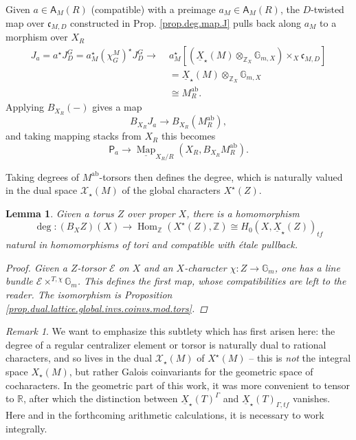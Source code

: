 \documentclass[openany]{amsbook}
\newtheorem{lemma}[theorem]{Lemma}
\theoremstyle{definition}
\theoremstyle{remark}
\newtheorem{remark}[theorem]{Remark}
\numberwithin{equation}{section}
\newcommand{\R}{\mathbb{R}}
\newcommand{\Z}{\mathbb{Z}}
\newcommand{\G}{\mathbb{G}}
\newcommand{\cE}{\mathcal{E}}
\newcommand{\cX}{\mathcal{X}}
\newcommand{\ul}[1]{\underline{#1}}
\renewcommand{\-}{\operatorname{-}}
\newcommand{\Hom}{\operatorname{Hom}}
\newcommand{\Map}{\ul{\operatorname{Map}}}
\newcommand{\bA}{\mathsf{A}}
\newcommand{\bP}{\mathsf{P}}
\newcommand{\fc}{\mathfrak{c}}
\newcommand{\tf}{\mathit{tf}}
\newcommand{\ab}{\mathrm{ab}}
\begin{document}
Given $a \in \bA_{M}(R)$ (compatible) with a preimage $a_M \in \bA_M(R)$, the $D$-twisted map over $\fc_{M,D}$ constructed in Prop. \ref{prop.deg.map.J} pulls back along $a_M$ to a morphism over $X_R$
\begin{align*}
    J_{a} = a^\star J^G_D = a_M^\star (\chi^M_G)^\star J^G_D \longrightarrow \; & a_M^\star\left[(\ul{X}_\star(M) \otimes_{\Z_X} \G_{m,X}) \times_X \fc_{M,D}\right] \\
        &= \ul{X}_\star(M) \otimes_{\Z_X} \G_{m,X} \\
        &\cong M^{\ab}_R.
\end{align*}
Applying $B_{X_R}(-)$ gives a map
$$
    B_{X_R} J_{a} \to B_{X_R}(M^{\ab}_R),
$$
and taking mapping stacks from $X_R$ this becomes
$$
    \bP_a \to \Map_{X_R/R}(X_R, B_{X_R} M^{\ab}_R). 
$$

Taking degrees of $M^{\ab}$-torsors then defines the degree, which is naturally valued in the dual space $\cX_\star(M)$ of the global characters $X^\star(Z)$. 

\begin{lemma}\label{lem.deg.B.torus}
    Given a torus $Z$ over proper $X$, there is a homomorphism
    $$
        \deg : (B_X Z)(X) \to \Hom_{\Z}(X^\star(Z), \Z) \cong H_0(X, \ul{X}_\star(Z))_{\tf}
    $$
    natural in homomorphisms of tori and compatible with \'etale pullback.
    \begin{proof}
        Given a $Z$-torsor $\cE$ on $X$ and an $X$-character $\chi : Z \to \G_m$, one has a line bundle $\cE \times^{T, \chi} \G_m$. This defines the first map, whose compatibilities are left to the reader. The isomorphism is Proposition \ref{prop.dual.lattice.global.invs.coinvs.mod.tors}.
    \end{proof}
\end{lemma}

\begin{remark}\label{rmk.deg.reg.centr.def.integrally}
    We want to emphasize this subtlety which has first arisen here: the degree of a regular centralizer element or torsor is naturally dual to rational characters, and so lives in the dual $\cX_\star(M)$ of $X^\star(M)$ -- this is \emph{not} the integral space $X_\star(M)$, but rather Galois coinvariants for the geometric space of cocharacters. In the geometric part of this work, it was more convenient to tensor to $\R$, after which the distinction between $\ul{X}_\star(T)^\Gamma$ and $\ul{X}_\star(T)_{\Gamma, \tf}$ vanishes. Here and in the forthcoming arithmetic calculations, it is necessary to work integrally.
\end{remark}
\end{document}
